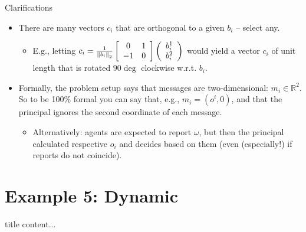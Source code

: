 \documentclass[english,10pt
,aspectratio=169
]{beamer}
\begin{document}
\begin{frame}{Clarifications}
	\begin{itemize}
		\item There are many vectors $c_i$ that are orthogonal to a given $b_i$ -- select any.
		\begin{itemize}
			\item E.g., letting $c_i = \frac{1}{\left\| b_i \right\|_2 } \left[ \begin{array}{c c} 0 & 1 \\ -1 & 0 \end{array} \right] \left( \begin{array}{c}
				b_i^1 \\ b_i^2
			\end{array} \right)$ would yield a vector $c_i$ of unit length that is rotated $90\deg$ clockwise w.r.t. $b_i$.
		\end{itemize}
		\item Formally, the problem setup says that messages are two-dimensional: $m_i \in \mathbb{R}^2$. So to be 100\% formal you can say that, e.g., $m_i = (o^i, 0)$, and that the principal ignores the second coordinate of each message.
		\begin{itemize}
			\item Alternatively: agents are expected to report $\omega$, but then the principal calculated respective $o_i$ and decides based on them (even (especially!) if reports do not coincide).
		\end{itemize}
	\end{itemize}
\end{frame}



\section{Example 5: Dynamic }

\begin{frame}{title}
content...
\end{frame}
\end{document}
